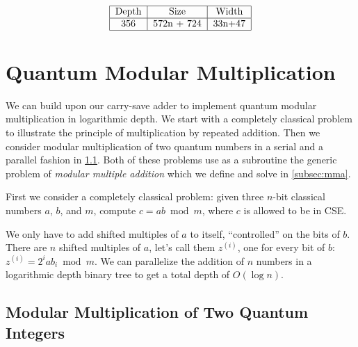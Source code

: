 \documentclass[twoside]{article}
\begin{document}
\begin{table}
\begin{displaymath}
\begin{tabular}{|c|c|c|c|}
\hline
\text{Depth} & \text{Size} & \text{Width} \\
\hline
356 & 572n + 724 & 33n+47 \\
\hline
\end{tabular}
\end{displaymath}
\centerline{}
\label{tab:csa-tile-resources}
\end{table}


%
\section{Quantum Modular Multiplication}
\label{sec:csa-mod-mult}

We can build upon our carry-save adder to implement quantum modular
multiplication in logarithmic depth. We start with a completely classical
problem to illustrate the principle of multiplication by repeated addition.
Then we consider modular multiplication of two quantum numbers in a serial
and a parallel fashion in
\ref{subsec:csa-mod-mult-qq}. Both of these problems use as a subroutine the
generic problem of \emph{modular multiple addition} which we define and solve
in \ref{subsec:mma}.

First we consider a completely classical problem:
given three $n$-bit classical numbers $a$, $b$, and $m$,
compute $c = ab \bmod m$, where $c$ is allowed to be in CSE.

We only have to add shifted
multiples of $a$ to itself, ``controlled'' on the bits of $b$. There are
$n$ shifted multiples of $a$, let's call them $z^{(i)}$, one for every bit of $b$:
$z^{(i)} = 2^i a b_i \bmod m$.
We can parallelize the addition of $n$ numbers in a logarithmic depth
binary tree to get a total depth of $O(\log n)$.

\subsection{Modular Multiplication of Two Quantum Integers}
\label{subsec:csa-mod-mult-qq}
\end{document}
